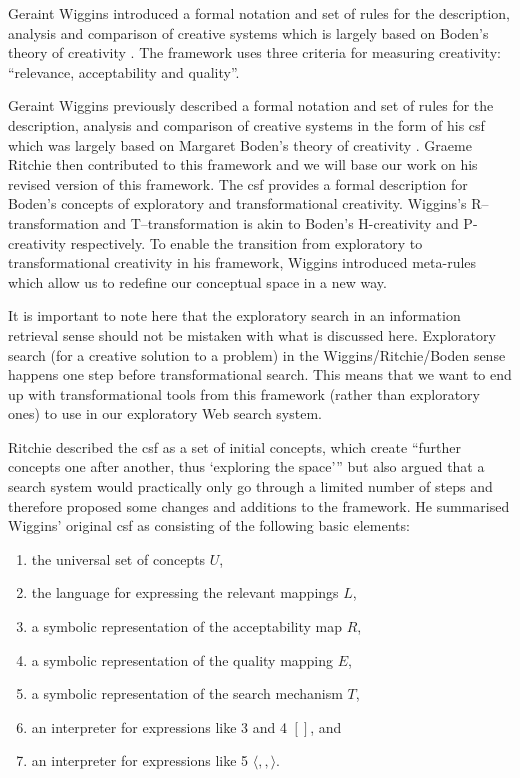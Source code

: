 \spirals


Geraint Wiggins introduced a formal notation and set of rules for the description, analysis and comparison of creative systems \citeyear{Wiggins2006} which is largely based on Boden's theory of creativity \citeyear{Boden2003}. The framework uses three criteria for measuring creativity: ``relevance, acceptability and quality''.

Geraint Wiggins previously described a formal notation and set of rules for the description, analysis and comparison of creative systems in the form of his \gls{csf} \autocite{Wiggins2006} which was largely based on Margaret Boden's theory of creativity \autocite{Boden2003}. Graeme Ritchie then contributed to this framework \autocite{Ritchie2012} and we will base our work on his revised version of this framework. The \gls{csf} provides a formal description for Boden's concepts of exploratory and transformational creativity. Wiggins's R–transformation and T–transformation is akin to Boden's H-creativity and P-creativity respectively. To enable the transition from exploratory to transformational creativity in his framework, Wiggins introduced meta-rules which allow us to redefine our conceptual space in a new way.

It is important to note here that the exploratory search in an information retrieval sense should not be mistaken with what is discussed here. Exploratory search (for a creative solution to a problem) in the Wiggins/Ritchie/Boden sense happens one step before transformational search. This means that we want to end up with transformational tools from this framework (rather than exploratory ones) to use in our exploratory Web search system.

Ritchie described the \gls{csf} as a set of initial concepts, which create ``further concepts one after another, thus `exploring the space''' but also argued that a search system would practically only go through a limited number of steps and therefore proposed some changes and additions to the framework. He summarised Wiggins' original \gls{csf} as consisting of the following basic elements:

\begin{enumerate}
	\item the universal set of concepts $U$,
	\item the language for expressing the relevant mappings $L$,
	\item a symbolic representation of the acceptability map $R$,
	\item a symbolic representation of the quality mapping $E$,
  \item a symbolic representation of the search mechanism $T$,
	\item an interpreter for expressions like 3 and 4 $[ ]$, and
	\item an interpreter for expressions like 5 $\langle , , \rangle$.
\end{enumerate}

